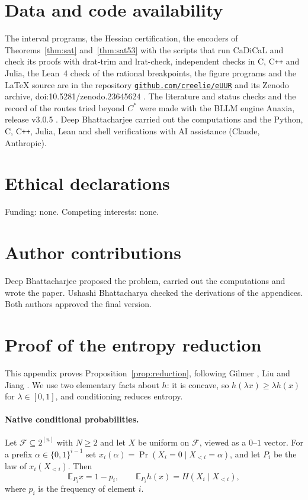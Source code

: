 \documentclass[aps,prd,twocolumn,superscriptaddress,nofootinbib,longbibliography,floatfix,amsmath,amssymb,10pt]{revtex4-2}
\theoremstyle{plain}
\theoremstyle{definition}
\theoremstyle{plain}
\newcommand{\EE}{\mathbb{E}}
\newcommand{\cF}{\mathcal{F}}
\newcommand{\Cs}{C^{*}}
\newcommand{\codeDOI}{\href{https://github.com/creelie/eUUR}{\nolinkurl{github.com/creelie/eUUR}}}
\begin{document}
\section*{Data and code availability}
The interval programs, the Hessian certification, the encoders of Theorems~\ref{thm:sat} and~\ref{thm:sat53} with the scripts that run CaDiCaL and check its proofs with drat-trim and lrat-check, independent checks in C, C\texttt{++} and Julia, the Lean~4 check of the rational breakpoints, the figure programs and the \LaTeX{} source are in the repository \codeDOI{} and its Zenodo archive, doi:10.5281/zenodo.23645624 \cite{BB26z}. The literature and status checks and the record of the routes tried beyond $\Cs$ were made with the BLLM engine Anaxia, release v3.0.5 \cite{Ana26}. Deep Bhattacharjee carried out the computations and the Python, C, C\texttt{++}, Julia, Lean and shell verifications with AI assistance (Claude, Anthropic).

\section*{Ethical declarations}
Funding: none. Competing interests: none.

\section*{Author contributions}
Deep Bhattacharjee proposed the problem, carried out the computations and wrote the paper. Ushashi Bhattacharya checked the derivations of the appendices. Both authors approved the final version.

\appendix

\section{Proof of the entropy reduction}\label{app:reduction}

This appendix proves Proposition~\ref{prop:reduction}, following Gilmer \cite{Gil22}, Liu \cite{Liu23} and Jiang \cite{Jia26}. We use two elementary facts about $h$: it is concave, so $h(\lambda x)\ge\lambda h(x)$ for $\lambda\in[0,1]$, and conditioning reduces entropy.

\paragraph*{Native conditional probabilities.} Let $\cF\subseteq 2^{[n]}$ with $N\ge 2$ and let $X$ be uniform on $\cF$, viewed as a $0$--$1$ vector. For a prefix $\alpha\in\{0,1\}^{i-1}$ set $x_i(\alpha)=\Pr(X_i=0\mid X_{<i}=\alpha)$, and let $P_i$ be the law of $x_i(X_{<i})$. Then
\begin{equation}\label{eq:native}
\EE_{P_i}x=1-p_i,\qquad \EE_{P_i}h(x)=H(X_i\mid X_{<i}),
\end{equation}
where $p_i$ is the frequency of element $i$.
\end{document}
